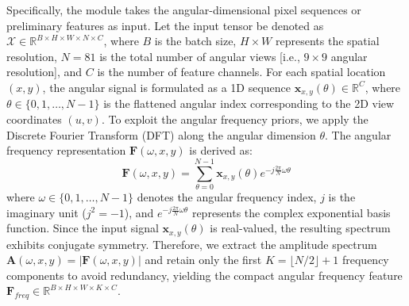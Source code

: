 Specifically, the module takes the angular-dimensional pixel sequences or preliminary features as input. Let the input tensor be denoted as $\mathcal{X} \in \mathbb{R}^{B \times H \times W \times N \times C}$, where $B$ is the batch size, $H \times W$ represents the spatial resolution, $N = 81$ is the total number of angular views  [i.e., $9 \times 9$ angular resolution], and $C$ is the number of feature channels. For each spatial location $(x, y)$, the angular signal is formulated as a 1D sequence $\mathbf{x}_{x,y}(\theta) \in \mathbb{R}^C$, where $\theta \in \{0, 1, \dots, N-1\}$ is the flattened angular index corresponding to the 2D view coordinates $(u, v)$. To exploit the angular frequency priors, we apply the Discrete Fourier Transform (DFT) along the angular dimension $\theta$. The angular frequency representation $\mathbf{F}(\omega, x, y)$ is derived as:
\begin{equation}
\label{eq:eq33}
\mathbf{F}(\omega, x, y) = \sum_{\theta=0}^{N-1} \mathbf{x}_{x,y}(\theta) e^{-j \frac{2\pi}{N} \omega \theta}
\end{equation}
where $\omega \in \{0, 1, \dots, N-1\}$ denotes the angular frequency index, $j$ is the imaginary unit ($j^2 = -1$), and $e^{-j \frac{2\pi}{N} \omega \theta}$ represents the complex exponential basis function. Since the input signal $\mathbf{x}_{x,y}(\theta)$ is real-valued, the resulting spectrum exhibits conjugate symmetry. Therefore, we extract the amplitude spectrum $\mathbf{A}(\omega, x, y) = |\mathbf{F}(\omega, x, y)|$ and retain only the first $K = \lfloor N/2 \rfloor + 1$ frequency components to avoid redundancy, yielding the compact angular frequency feature $\mathbf{F}_{freq} \in \mathbb{R}^{B \times H \times W \times K \times C}$.


